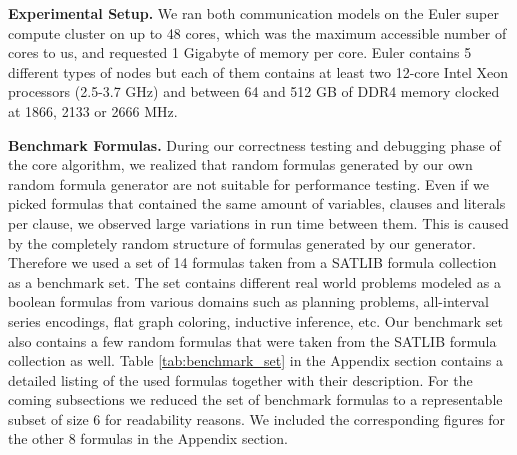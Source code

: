 \documentclass[letterpaper]{article}
\newcommand{\mypar}[1]{{\bf #1.}}
\begin{document}
\mypar{Experimental Setup}
We ran both communication models on the Euler super compute cluster \cite{euler} on up to 48 cores, which was the maximum accessible number of cores to us, and requested 1 Gigabyte of memory per core. Euler contains 5 different types of nodes but each of them contains at least two 12-core Intel Xeon processors (2.5-3.7 GHz) and between 64 and 512 GB of DDR4 memory clocked at 1866, 2133 or 2666 MHz.

\mypar{Benchmark Formulas}
During our correctness testing and debugging phase of the core algorithm, we realized that random formulas generated by our own random formula generator are not suitable for performance testing.
Even if we picked formulas that contained the same amount of variables, clauses and literals per clause, we observed large variations in run time between them.
This is caused by the completely random structure of formulas generated by our generator.
Therefore we used a set of 14 formulas taken from a SATLIB formula collection as a benchmark set.
The set contains different real world problems modeled as a boolean formulas from various domains such as planning problems,
all-interval series encodings, flat graph coloring, inductive inference, etc.
Our benchmark set also contains a few random formulas that were taken from the SATLIB formula collection as well.
Table \ref{tab:benchmark_set} in the Appendix section contains a detailed listing of the used formulas together with their description.
For the coming subsections we reduced the set of benchmark formulas to a representable subset of size 6 for readability reasons.
We included the corresponding figures for the other 8 formulas in the Appendix section.
\end{document}
